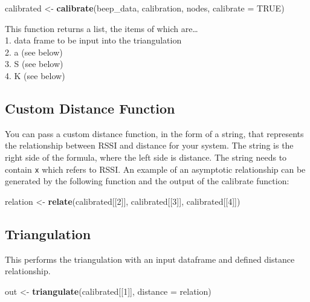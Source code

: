\documentclass[
]{book}
\newenvironment{Shaded}{\begin{snugshade}}{\end{snugshade}}
\newcommand{\DataTypeTok}[1]{\textcolor[rgb]{0.13,0.29,0.53}{#1}}
\newcommand{\DecValTok}[1]{\textcolor[rgb]{0.00,0.00,0.81}{#1}}
\newcommand{\KeywordTok}[1]{\textcolor[rgb]{0.13,0.29,0.53}{\textbf{#1}}}
\newcommand{\NormalTok}[1]{#1}
\newcommand{\OtherTok}[1]{\textcolor[rgb]{0.56,0.35,0.01}{#1}}
\newcommand{\StringTok}[1]{\textcolor[rgb]{0.31,0.60,0.02}{#1}}
\begin{document}
\begin{Shaded}
\begin{Highlighting}[]
\NormalTok{calibrated <-}\StringTok{ }\KeywordTok{calibrate}\NormalTok{(beep_data, calibration, nodes, }\DataTypeTok{calibrate =} \OtherTok{TRUE}\NormalTok{)}
\end{Highlighting}
\end{Shaded}

This function returns a list, the items of which are\ldots{}\\
1. data frame to be input into the triangulation\\
2. a (see below)\\
3. S (see below)\\
4. K (see below)

\hypertarget{custom-distance-function}{%
\subsection{Custom Distance Function}\label{custom-distance-function}}

You can pass a custom distance function, in the form of a string, that represents the relationship between RSSI and distance for your system. The string is the right side of the formula, where the left side is distance. The string needs to contain \texttt{x} which refers to RSSI. An example of an asymptotic relationship can be generated by the following function and the output of the calibrate function:

\begin{Shaded}
\begin{Highlighting}[]
\NormalTok{relation <-}\StringTok{ }\KeywordTok{relate}\NormalTok{(calibrated[[}\DecValTok{2}\NormalTok{]], calibrated[[}\DecValTok{3}\NormalTok{]], calibrated[[}\DecValTok{4}\NormalTok{]])}
\end{Highlighting}
\end{Shaded}

\hypertarget{triangulation}{%
\subsection{Triangulation}\label{triangulation}}

This performs the triangulation with an input dataframe and defined distance relationship.

\begin{Shaded}
\begin{Highlighting}[]
\NormalTok{out <-}\StringTok{ }\KeywordTok{triangulate}\NormalTok{(calibrated[[}\DecValTok{1}\NormalTok{]], }\DataTypeTok{distance =}\NormalTok{ relation)}
\end{Highlighting}
\end{Shaded}
\end{document}
